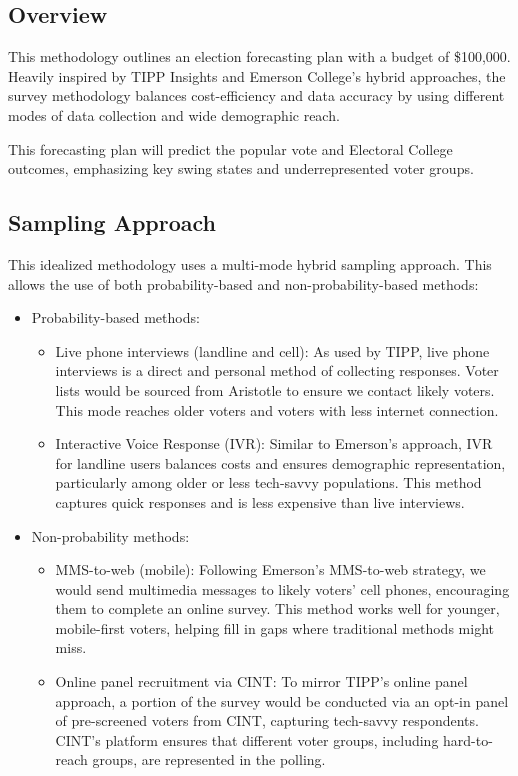 \documentclass[
  letterpaper,
  DIV=11,
  numbers=noendperiod]{scrartcl}
\begin{document}
\hypertarget{overview-1}{%
\subsection{Overview}\label{overview-1}}

This methodology outlines an election forecasting plan with a budget of
\$100,000. Heavily inspired by TIPP Insights and Emerson College's
hybrid approaches, the survey methodology balances cost-efficiency and
data accuracy by using different modes of data collection and wide
demographic reach.

This forecasting plan will predict the popular vote and Electoral
College outcomes, emphasizing key swing states and underrepresented
voter groups.

\hypertarget{sampling-approach}{%
\subsection{Sampling Approach}\label{sampling-approach}}

This idealized methodology uses a multi-mode hybrid sampling approach.
This allows the use of both probability-based and non-probability-based
methods:

\begin{itemize}
\item
  Probability-based methods:

  \begin{itemize}
  \item
    Live phone interviews (landline and cell): As used by TIPP, live
    phone interviews is a direct and personal method of collecting
    responses. Voter lists would be sourced from Aristotle to ensure we
    contact likely voters. This mode reaches older voters and voters
    with less internet connection.
  \item
    Interactive Voice Response (IVR): Similar to Emerson's approach, IVR
    for landline users balances costs and ensures demographic
    representation, particularly among older or less tech-savvy
    populations. This method captures quick responses and is less
    expensive than live interviews.
  \end{itemize}
\item
  Non-probability methods:

  \begin{itemize}
  \item
    MMS-to-web (mobile): Following Emerson's MMS-to-web strategy, we
    would send multimedia messages to likely voters' cell phones,
    encouraging them to complete an online survey. This method works
    well for younger, mobile-first voters, helping fill in gaps where
    traditional methods might miss.
  \item
    Online panel recruitment via CINT: To mirror TIPP's online panel
    approach, a portion of the survey would be conducted via an opt-in
    panel of pre-screened voters from CINT, capturing tech-savvy
    respondents. CINT's platform ensures that different voter groups,
    including hard-to-reach groups, are represented in the polling.
  \end{itemize}
\end{itemize}
\end{document}
